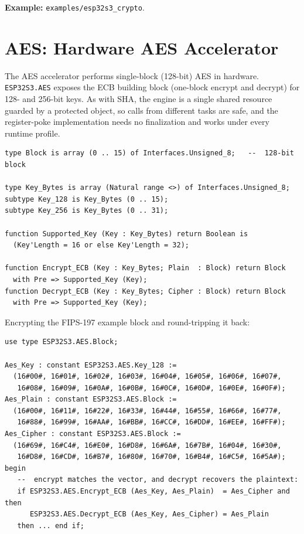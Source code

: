 \noindent\textbf{Example:} \texttt{examples/esp32s3\_crypto}.

\section{AES: Hardware AES Accelerator}
\label{app:int:aes}

The AES accelerator performs single-block (128-bit) AES in hardware.
\texttt{ESP32S3.AES} exposes the ECB building block (one-block encrypt and
decrypt) for 128- and 256-bit keys. As with SHA, the engine is a single shared
resource guarded by a protected object, so calls from different tasks are safe,
and the register-poke implementation needs no finalization and works under every
runtime profile.


\begin{lstlisting}
type Block is array (0 .. 15) of Interfaces.Unsigned_8;   --  128-bit block

type Key_Bytes is array (Natural range <>) of Interfaces.Unsigned_8;
subtype Key_128 is Key_Bytes (0 .. 15);
subtype Key_256 is Key_Bytes (0 .. 31);

function Supported_Key (Key : Key_Bytes) return Boolean is
  (Key'Length = 16 or else Key'Length = 32);

function Encrypt_ECB (Key : Key_Bytes; Plain  : Block) return Block
  with Pre => Supported_Key (Key);
function Decrypt_ECB (Key : Key_Bytes; Cipher : Block) return Block
  with Pre => Supported_Key (Key);
\end{lstlisting}

Encrypting the FIPS-197 example block and round-tripping it back:

\begin{lstlisting}
use type ESP32S3.AES.Block;

Aes_Key : constant ESP32S3.AES.Key_128 :=
  (16#00#, 16#01#, 16#02#, 16#03#, 16#04#, 16#05#, 16#06#, 16#07#,
   16#08#, 16#09#, 16#0A#, 16#0B#, 16#0C#, 16#0D#, 16#0E#, 16#0F#);
Aes_Plain : constant ESP32S3.AES.Block :=
  (16#00#, 16#11#, 16#22#, 16#33#, 16#44#, 16#55#, 16#66#, 16#77#,
   16#88#, 16#99#, 16#AA#, 16#BB#, 16#CC#, 16#DD#, 16#EE#, 16#FF#);
Aes_Cipher : constant ESP32S3.AES.Block :=
  (16#69#, 16#C4#, 16#E0#, 16#D8#, 16#6A#, 16#7B#, 16#04#, 16#30#,
   16#D8#, 16#CD#, 16#B7#, 16#80#, 16#70#, 16#B4#, 16#C5#, 16#5A#);
begin
   --  encrypt matches the vector, and decrypt recovers the plaintext:
   if ESP32S3.AES.Encrypt_ECB (Aes_Key, Aes_Plain)  = Aes_Cipher and then
      ESP32S3.AES.Decrypt_ECB (Aes_Key, Aes_Cipher) = Aes_Plain
   then ... end if;
\end{lstlisting}

